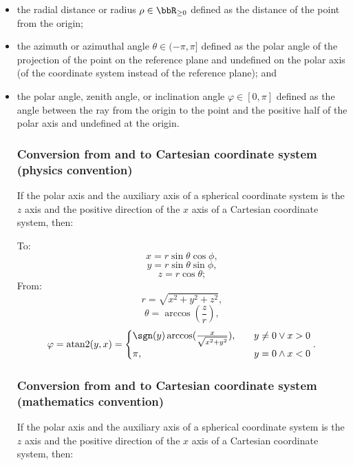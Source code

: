 \documentclass[a4paper,12pt]{report}
\begin{document}
\begin{itemize}
\begin{itemize}
\subsubsection{Mathematics convention or azimuth-inclination convention definition}
A spherical coordinate system is a three-dimensional coordinate system that specifies point positions by a polar axis (a chosen directed line) and an auxiliary axis (a reference ray) with the intersection of the two axes called the origin and the plane passing through the origin and perpendicular to the polar axis equipped with polar coordinate system with the polar axis being the auxiliary axis called the reference plane. The three spherical coordinates $(\rho,\theta,\varphi)$ are:
\bit
\item the radial distance or radius $\rho\in\bbR_{\geq 0}$ defined as the distance of the point from the origin;
\item the azimuth or azimuthal angle $\theta\in(-\pi,\pi]$ defined as the polar angle of the projection of the point on the reference plane and undefined on the polar axis (of the coordinate system instead of the reference plane); and
\item the polar angle, zenith angle, or inclination angle $\varphi\in[0,\pi]$ defined as the angle between the ray from the origin to the point and the positive half of the polar axis and undefined at the origin.
\eit
\subsubsection{Conversion from and to Cartesian coordinate system (physics convention)}
If the polar axis and the auxiliary axis of a spherical coordinate system is the $z$ axis and the positive direction of the $x$ axis of a Cartesian coordinate system, then:

To:
\[x=r\sin\theta\cos\phi,\]
\[y=r\sin\theta\sin\phi,\]
\[z=r\cos\theta;\]
From:
\[r=\sqrt{x^2+y^2+z^2},\]
\[\theta=\arccos(\frac{z}{r}),\]
\[\varphi=\operatorname{atan2}(y,x)=\begin{cases}\sgn(y)\arccos(\frac{x}{\sqrt{x^2+y^2}}),\quad&y\neq 0\lor x>0\\\pi,\quad&y=0\land x<0\end{cases}.\]
\subsubsection{Conversion from and to Cartesian coordinate system (mathematics convention)}
If the polar axis and the auxiliary axis of a spherical coordinate system is the $z$ axis and the positive direction of the $x$ axis of a Cartesian coordinate system, then:


\end{itemize}
\end{itemize}
\end{document}
